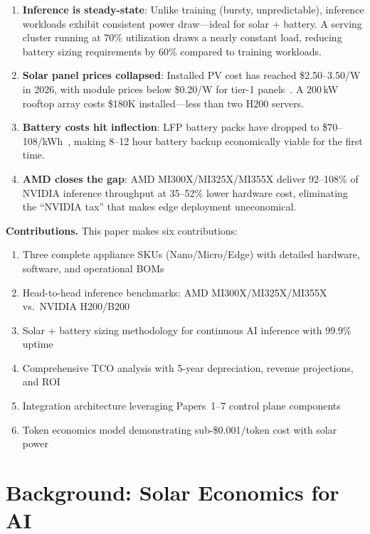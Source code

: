 \documentclass[conference,10pt,letterpaper]{IEEEtran}
\begin{document}
\begin{enumerate}
\item \textbf{Inference is steady-state}: Unlike training (bursty, unpredictable), inference workloads exhibit consistent power draw---ideal for solar + battery. A serving cluster running at 70\% utilization draws a nearly constant load, reducing battery sizing requirements by 60\% compared to training workloads.

\item \textbf{Solar panel prices collapsed}: Installed PV cost has reached \$2.50--3.50/W in 2026, with module prices below \$0.20/W for tier-1 panels~\cite{iea2025solar}. A 200\,kW rooftop array costs \$180K installed---less than two H200 servers.

\item \textbf{Battery costs hit inflection}: LFP battery packs have dropped to \$70--108/kWh~\cite{bnef2024battery}, making 8--12 hour battery backup economically viable for the first time.

\item \textbf{AMD closes the gap}: AMD MI300X/MI325X/MI355X deliver 92--108\% of NVIDIA inference throughput at 35--52\% lower hardware cost, eliminating the ``NVIDIA tax'' that makes edge deployment uneconomical.
\end{enumerate}

\textbf{Contributions.} This paper makes six contributions:
\begin{enumerate}
\item Three complete appliance SKUs (Nano/Micro/Edge) with detailed hardware, software, and operational BOMs
\item Head-to-head inference benchmarks: AMD MI300X/MI325X/MI355X vs.\ NVIDIA H200/B200
\item Solar + battery sizing methodology for continuous AI inference with 99.9\% uptime
\item Comprehensive TCO analysis with 5-year depreciation, revenue projections, and ROI
\item Integration architecture leveraging Papers~1--7 control plane components
\item Token economics model demonstrating sub-\$0.001/token cost with solar power
\end{enumerate}

\section{Background: Solar Economics for AI}
\label{sec:solar}
\end{document}
